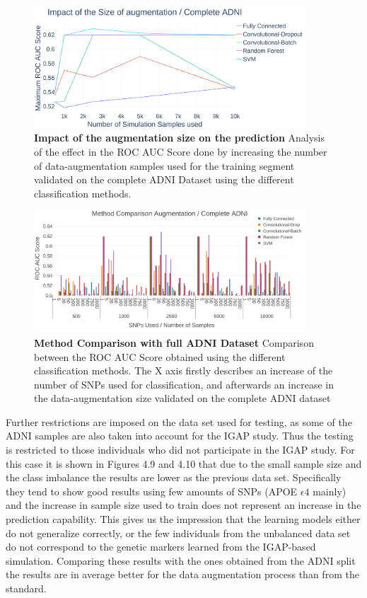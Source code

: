 \begin{figure}[!ht]
\centerline{\includegraphics[width=4in]{images/results/ImpactDataAug.png}}
\caption{{\bf Impact of the augmentation size on the prediction}
Analysis of the effect in the ROC AUC Score done by increasing the number of data-augmentation samples used for the training segment validated on the complete ADNI Dataset using the different classification methods.}
\label{fig10}
\end{figure}

\begin{figure}[!ht]
\centerline{\includegraphics[width=4in]{images/results/DataAugComplete.png}}
\caption{{\bf Method Comparison with full ADNI Dataset} 
Comparison between the ROC AUC Score obtained using the different classification methods. The X axis firstly describes an increase of the number of SNPs used for classification, and afterwards an increase in the data-augmentation size validated on the complete ADNI dataset}
\label{fig11}
\end{figure}


Further restrictions are imposed on the data set used for testing, as some of the ADNI samples are also taken into account for the IGAP study. Thus the testing is restricted to those individuals who did not participate in the IGAP study. For this case it is shown in Figures 4.9 and 4.10 that due to the small sample size and the class imbalance the results are lower as the previous data set. Specifically they tend to show good results using few amounts of SNPs (APOE $\epsilon4$ mainly) and the increase in sample size used to train does not represent an increase in the prediction capability. This gives us the impression that the learning models either do not generalize correctly, or the few individuals from the unbalanced data set do not correspond to the genetic markers learned from the IGAP-based simulation. Comparing these results with the ones obtained from the ADNI split the results are in average better for the data augmentation process than from the standard. 

